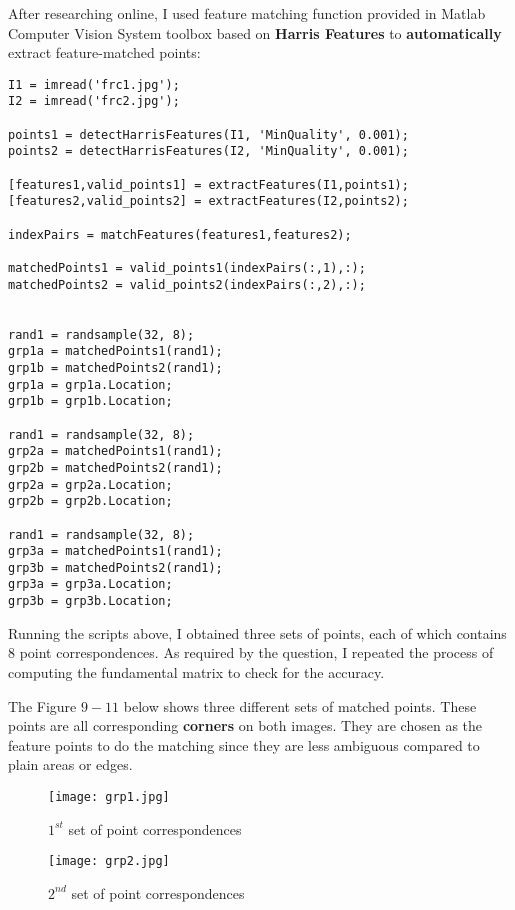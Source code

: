 \begin{questions}
\begin{parts}
\begin{solution}
    After researching online, I used feature matching function provided in Matlab Computer Vision System toolbox based on \textbf{Harris Features} to \textbf{automatically} extract feature-matched points:
    
    \begin{lstlisting}
I1 = imread('frc1.jpg');
I2 = imread('frc2.jpg');

points1 = detectHarrisFeatures(I1, 'MinQuality', 0.001);
points2 = detectHarrisFeatures(I2, 'MinQuality', 0.001);

[features1,valid_points1] = extractFeatures(I1,points1);
[features2,valid_points2] = extractFeatures(I2,points2);

indexPairs = matchFeatures(features1,features2);

matchedPoints1 = valid_points1(indexPairs(:,1),:);
matchedPoints2 = valid_points2(indexPairs(:,2),:);


rand1 = randsample(32, 8);
grp1a = matchedPoints1(rand1);
grp1b = matchedPoints2(rand1);
grp1a = grp1a.Location;
grp1b = grp1b.Location;

rand1 = randsample(32, 8);
grp2a = matchedPoints1(rand1);
grp2b = matchedPoints2(rand1);
grp2a = grp2a.Location;
grp2b = grp2b.Location;

rand1 = randsample(32, 8);
grp3a = matchedPoints1(rand1);
grp3b = matchedPoints2(rand1);
grp3a = grp3a.Location;
grp3b = grp3b.Location;
    \end{lstlisting}
    Running the scripts above, I obtained three sets of points, each of which contains 8 point correspondences. As required by the question, I repeated the process of computing the fundamental matrix to check for the accuracy.
    
    The Figure $9 - 11$ below shows three different sets of matched points. These points are all corresponding \textbf{corners} on both images. They are chosen as the feature points to do the matching since they are less ambiguous compared to plain areas or edges.
    
    \begin{figure}[H]
        \centering
        \texttt{[image: grp1.jpg]}
        \caption{$1 ^{st}$ set of point correspondences}
        \label{fig:mesh1}
    \end{figure}
    
    \begin{figure}[H]
        \centering
        \texttt{[image: grp2.jpg]}
        \caption{$2 ^{nd}$ set of point correspondences}
    \end{figure}
    

\end{solution}
\end{parts}
\end{questions}
